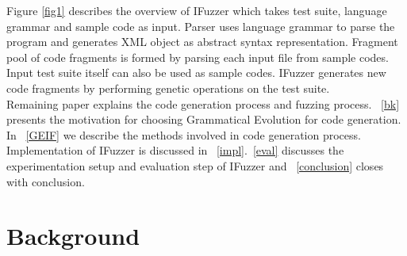 \documentclass{acm_proc_article-sp}
\begin{document}
\indent  Figure \ref{fig1} describes the overview of IFuzzer which takes test suite, language grammar and sample code as input. Parser uses language grammar to parse the program and generates XML object as abstract syntax representation. Fragment pool of code fragments is formed by parsing each input file from sample codes. Input test suite itself can also be used as sample codes. IFuzzer generates new code fragments by performing genetic operations on the test suite. \\
\indent Remaining paper explains the code generation process and fuzzing process. ~\autoref{bk} presents the motivation for choosing Grammatical Evolution for code generation. In ~\autoref{GEIF} we describe the methods involved in code generation process. Implementation of IFuzzer is discussed in ~\autoref{impl}.~\autoref{eval} discusses the experimentation setup and evaluation step of IFuzzer and ~\autoref{conclusion} closes with conclusion.

\section{Background} \label{bk}
\end{document}
